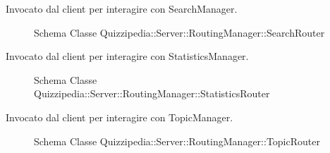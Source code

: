 Invocato dal client per interagire con SearchManager.
\begin{figure}[H]
\centering
\noindent{}
\caption{Schema Classe Quizzipedia::Server::RoutingManager::SearchRouter}
\end{figure}
Invocato dal client per interagire con StatisticsManager.
\begin{figure}[H]
\centering
\noindent{}
\caption{Schema Classe Quizzipedia::Server::RoutingManager::StatisticsRouter}
\end{figure}
Invocato dal client per interagire con TopicManager.
\begin{figure}[H]
\centering
\noindent{}
\caption{Schema Classe Quizzipedia::Server::RoutingManager::TopicRouter}
\end{figure}
